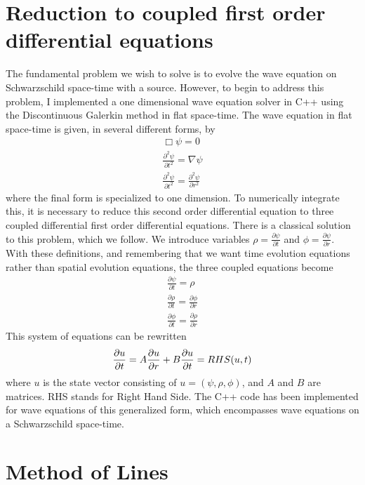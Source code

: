 \section{Reduction to coupled first order differential equations}


The fundamental problem we wish to solve is to evolve the wave equation on Schwarzschild space-time with a source. However, to begin to address this problem, I implemented a one dimensional wave equation solver in C++ using the Discontinuous Galerkin method in flat space-time. The wave equation in flat space-time is given, in several different forms, by
\begin{eqnarray}
  \Box\psi=0\\
  \frac{\partial^2\psi}{\partial t^2}=\nabla\psi\\
  \frac{\partial^2\psi}{\partial t^2}=\frac{\partial^2 \psi}{\partial r^2}
\end{eqnarray}
where the final form is specialized to one dimension. To numerically integrate this, it is necessary to reduce this second order differential equation to three coupled differential first order differential equations. There is a classical solution to this problem, which we follow. We introduce variables $\rho=\frac{\partial \psi}{\partial t}$ and $\phi = \frac{\partial\psi}{\partial r}$. With these definitions, and remembering that we want time evolution equations rather than spatial evolution equations, the three coupled equations become
\begin{eqnarray}
  \frac{\partial\psi}{\partial t} = \rho\\
  \frac{\partial\rho}{\partial t} = \frac{\partial \phi}{\partial r}\\
  \frac{\partial\phi}{\partial t} = \frac{\partial \rho}{\partial r}
\end{eqnarray}
This system of equations can be rewritten
\begin{equation}
  \frac{\partial u}{\partial t} = A\frac{\partial u}{\partial r} + B\nonumber\\
  \frac{\partial u}{\partial t} = RHS(u,t)
  \label{matrixdiff}
\end{equation}
where $u$ is the state vector consisting of $u=(\psi,\rho,\phi)$, and $A$ and $B$ are matrices. RHS stands for Right Hand Side. The C++ code has been implemented for wave equations of this generalized form, which encompasses wave equations on a Schwarzschild space-time.


\section{Method of Lines}


